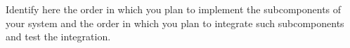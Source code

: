 Identify here the order in which you plan 
to implement the subcomponents of your system and the order in which you plan to integrate 
such subcomponents and test the integration.
